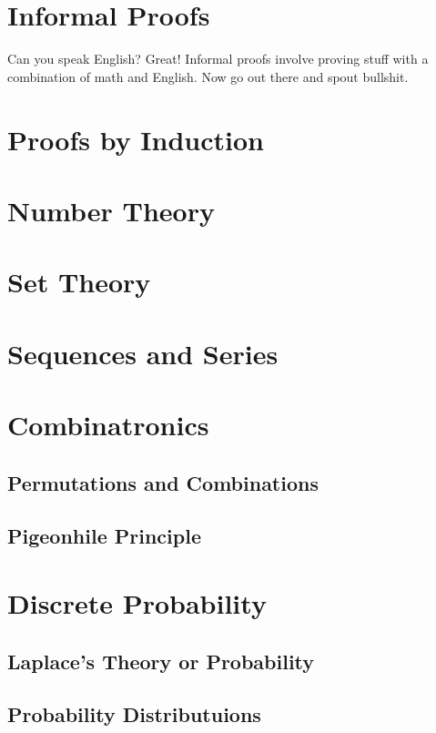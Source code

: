 \documentclass[a4paper]{article}
\begin{document}
\begin{multicols}{2}

	\section{Informal Proofs}
	Can you speak English? Great! Informal proofs involve
	proving stuff with a combination of math and English.
	Now go out there and spout bullshit.

	\section{Proofs by Induction}

	\section{Number Theory}

	\section{Set Theory}

	\section{Sequences and Series}

	\section{Combinatronics}
	\subsection{Permutations and Combinations}
	\subsection{Pigeonhile Principle}

	\section{Discrete Probability}
	\subsection{Laplace's Theory or Probability}
	\subsection{Probability Distributuions}

\end{multicols}
\end{document}
